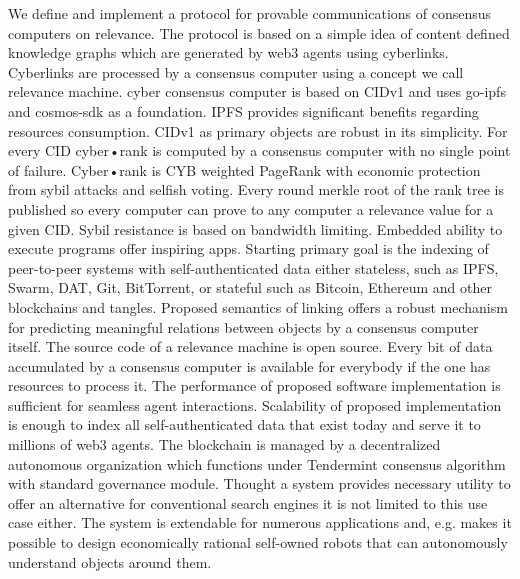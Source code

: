 \documentclass[8pt,oneside]{amsart}
\newcommand{\code}[1]{{\PlayBold #1}}
\begin{document}
We define and implement a protocol for provable communications of consensus computers on relevance.
The protocol is based on a simple idea of content defined knowledge graphs which are generated by web3 agents using cyberlinks.
Cyberlinks are processed by a consensus computer using a concept we call relevance machine.
\code{cyber} consensus computer is based on \code{CIDv1} and uses \code{go-ipfs} and \code{cosmos-sdk} as a foundation. IPFS provides significant benefits regarding resources consumption. CIDv1 as primary objects are robust in its simplicity. For every CID cyber•rank is computed by a consensus computer with no single point of failure. Cyber•rank is CYB weighted PageRank with economic protection from sybil attacks and selfish voting. Every round merkle root of the rank tree is published so every computer can prove to any computer a relevance value for a given CID. Sybil resistance is based on bandwidth limiting. Embedded ability to execute programs offer inspiring apps. Starting primary goal is the indexing of peer-to-peer systems with self-authenticated data either stateless, such as IPFS, Swarm, DAT, Git, BitTorrent, or stateful such as Bitcoin, Ethereum and other blockchains and tangles. Proposed semantics of linking offers a robust mechanism for predicting meaningful relations between objects by a consensus computer itself. The source code of a relevance machine is open source. Every bit of data accumulated by a consensus computer is available for everybody if the one has resources to process it. The performance of proposed software implementation is sufficient for seamless agent interactions. Scalability of proposed implementation is enough to index all self-authenticated data that exist today and serve it to millions of web3 agents. The blockchain is managed by a decentralized autonomous organization which functions under Tendermint consensus algorithm with standard governance module. Thought a system provides necessary utility to offer an alternative for conventional search engines it is not limited to this use case either. The system is extendable for numerous applications and, e.g. makes it possible to design economically rational self-owned robots that can autonomously understand objects around them.
\end{document}
